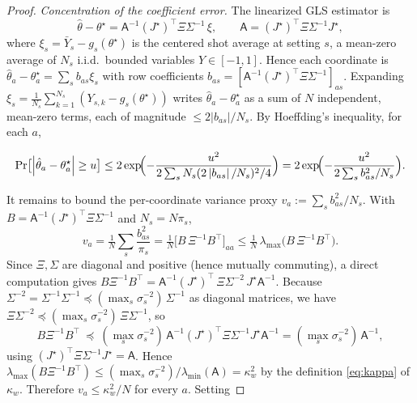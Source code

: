 \documentclass[aps,prxquantum,reprint,superscriptaddress,nofootinbib,amsmath,amssymb]{revtex4-2}
\newcommand{\abs}[1]{\left\lvert #1 \right\rvert}
\begin{document}
\begin{proof}
\emph{Concentration of the coefficient error.} The linearized GLS estimator is
\begin{equation*}
    \hat\theta-\theta^\star=\mathsf{A}^{-1}(J^\star)^\top\Xi\Sigma^{-1}\,\xi,
    \qquad
    \mathsf{A}=(J^\star)^\top\Xi\Sigma^{-1}J^\star,
\end{equation*}
where $\xi_s=\bar Y_s-g_s(\theta^\star)$ is the centered shot average at setting $s$, a mean-zero average of $N_s$ i.i.d.\ bounded variables $Y\in[-1,1]$. Hence each coordinate is $\hat\theta_a-\theta_a^\star=\sum_s b_{as}\xi_s$ with row coefficients $b_{as}=[\mathsf{A}^{-1}(J^\star)^\top\Xi\Sigma^{-1}]_{as}$. Expanding $\xi_s=\tfrac1{N_s}\sum_{k=1}^{N_s}(Y_{s,k}-g_s(\theta^\star))$ writes $\hat\theta_a-\theta_a^\star$ as a sum of $N$ independent, mean-zero terms, each of magnitude $\leq2\abs{b_{as}}/N_s$. By Hoeffding's inequality, for each $a$,
\begin{widetext}
\begin{equation*}
    \Pr\bigl[\abs{\hat\theta_a-\theta_a^\star}\geq u\bigr]\leq2\exp\!\Bigl(-\frac{u^2}{2\sum_s N_s(2\abs{b_{as}}/N_s)^2/4}\Bigr)=2\exp\!\Bigl(-\frac{u^2}{2\sum_s b_{as}^2/N_s}\Bigr).
\end{equation*}
\end{widetext}
It remains to bound the per-coordinate variance proxy $v_a:=\sum_s b_{as}^2/N_s$. With $B=\mathsf{A}^{-1}(J^\star)^\top\Xi\Sigma^{-1}$ and $N_s=N\pi_s$,
\begin{equation*}
    v_a=\tfrac1N\sum_s\frac{b_{as}^2}{\pi_s}=\tfrac1N\bigl[B\,\Xi^{-1}B^\top\bigr]_{aa}\leq\tfrac1N\,\lambda_{\max}\!\bigl(B\,\Xi^{-1}B^\top\bigr).
\end{equation*}
Since $\Xi,\Sigma$ are diagonal and positive (hence mutually commuting), a direct computation gives $B\Xi^{-1}B^\top=\mathsf{A}^{-1}(J^\star)^\top\,\Xi\Sigma^{-2}\,J^\star\mathsf{A}^{-1}$. Because $\Sigma^{-2}=\Sigma^{-1}\Sigma^{-1}\preceq(\max_s\sigma_s^{-2})\,\Sigma^{-1}$ as diagonal matrices, we have $\Xi\Sigma^{-2}\preceq(\max_s\sigma_s^{-2})\,\Xi\Sigma^{-1}$, so
\begin{equation*}
    B\Xi^{-1}B^\top\ \preceq\ (\max_s\sigma_s^{-2})\,\mathsf{A}^{-1}(J^\star)^\top\Xi\Sigma^{-1}J^\star\mathsf{A}^{-1}=(\max_s\sigma_s^{-2})\,\mathsf{A}^{-1},
\end{equation*}
using $(J^\star)^\top\Xi\Sigma^{-1}J^\star=\mathsf{A}$. Hence $\lambda_{\max}(B\Xi^{-1}B^\top)\leq(\max_s\sigma_s^{-2})/\lambda_{\min}(\mathsf{A})=\kappa_w^2$ by the definition \eqref{eq:kappa} of $\kappa_w$. Therefore $v_a\leq\kappa_w^2/N$ for every $a$. Setting

\end{proof}
\end{document}
